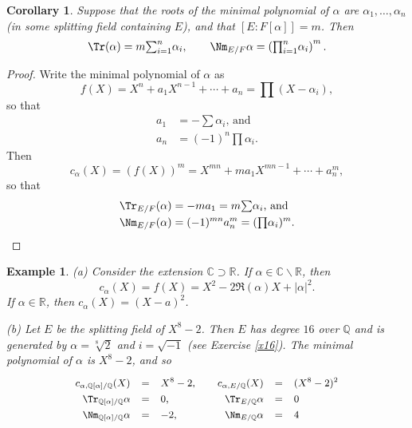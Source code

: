 \documentclass[a4paper,11pt,final,openany]{memoir}
\newtheorem{corollary}[X]{Corollary}
\newtheorem{example}[X]{Example}
\theoremstyle{nonumberplain}
\newtheorem{proof}{Proof.}
\begin{document}
\begin{corollary}
\label{ag34}Suppose that the roots of the minimal polynomial of $\alpha$ are
$\alpha_{1},\ldots,\alpha_{n}$ (in some splitting field containing $E$), and
that $[E\colon F[\alpha]]=m$. Then
\[
\Tr(\alpha)=m%
{\textstyle\sum\nolimits_{i=1}^{n}}
\alpha_{i},\qquad\Nm_{E/F}\alpha=\left(
{\textstyle\prod\nolimits_{i=1}^{n}}
\alpha_{i}\right)  ^{m}.
\]

\end{corollary}

\begin{proof}
Write the minimal polynomial of $\alpha$ as
\[
f(X)=X^{n}+a_{1}X^{n-1}+\cdots+a_{n}=%
{\textstyle\prod}
(X-\alpha_{i}),
\]
so that%
\begin{align*}
a_{1}  &  =-%
{\textstyle\sum}
\alpha_{i}\text{, and}\\
a_{n}  &  =(-1)^{n}%
{\textstyle\prod}
\alpha_{i}\text{.}%
\end{align*}
Then
\[
c_{\alpha}(X)=(f(X))^{m}=X^{mn}+ma_{1}X^{mn-1}+\cdots+a_{n}^{m},
\]
so that
\begin{align*}
\Tr_{E/F}(\alpha)  &  =-ma_{1}=m%
{\textstyle\sum}
\alpha_{i}\text{, and }\\
\Nm_{E/F}(\alpha)  &  =(-1)^{mn}a_{n}^{m}=(%
{\textstyle\prod}
\alpha_{i})^{m}\text{.}%
\end{align*}

\end{proof}

\begin{example}
\label{ag35}(a) Consider the extension $\mathbb{C}\supset\mathbb{R}$. If
$\alpha\in\mathbb{C}\smallsetminus\mathbb{R}$, then
\[
c_{\alpha}(X)=f(X)=X^{2}-2\Re(\alpha)X+|\alpha|^{2}.
\]
If $\alpha\in\mathbb{R}$, then $c_{\alpha}(X)=(X-a)^{2}$.

(b) Let $E$ be the splitting field of $X^{8}-2$. Then $E$ has degree $16$ over
$\mathbb{Q}{}$ and is generated by $\alpha=\sqrt[8]{2}$ and $i=\sqrt{-1}$ (see
Exercise \ref{x16}). The minimal polynomial of $\alpha$ is $X^{8}-2$, and so
\[\small
\renewcommand{\arraystretch}{1.3}
\begin{array}
[c]{rcllrcl}%
c_{\alpha,\mathbb{Q}{}[\alpha]/\mathbb{Q}{}}(X) & = & X^{8}-2, &  &
c_{\alpha,E/\mathbb{Q}{}}(X) & = & (X^{8}-2)^{2}\\
\Tr_{\mathbb{Q}[\alpha]/\mathbb{Q}}\alpha & = & 0, &  & \Tr_{E/\mathbb{Q}%
}\alpha & = & 0\\
\Nm_{\mathbb{Q}[\alpha]/\mathbb{Q}}\alpha & = & -2, &  &
\Nm_{E/\mathbb{Q}}\alpha & = & 4
\end{array}
\]

\end{example}
\end{document}
